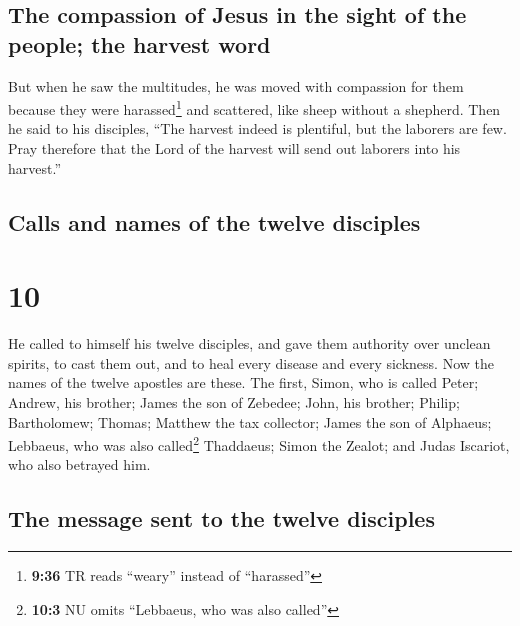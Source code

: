 \hypertarget{the-compassion-of-jesus-in-the-sight-of-the-people-the-harvest-word}{%
\subsection{The compassion of Jesus in the sight of the people; the
harvest
word}\label{the-compassion-of-jesus-in-the-sight-of-the-people-the-harvest-word}}

 But when he saw the multitudes, he was moved with
compassion for them because they were harassed\footnote{\textbf{9:36} TR
  reads ``weary'' instead of ``harassed''} and scattered, like sheep
without a shepherd.  Then he said to his disciples, ``The
harvest indeed is plentiful, but the laborers are few. 
Pray therefore that the Lord of the harvest will send out laborers into
his harvest.''

\hypertarget{calls-and-names-of-the-twelve-disciples}{%
\subsection{Calls and names of the twelve
disciples}\label{calls-and-names-of-the-twelve-disciples}}

\hypertarget{section-9}{%
\section{10}\label{section-9}}

 He called to himself his twelve disciples, and gave them
authority over unclean spirits, to cast them out, and to heal every
disease and every sickness.  Now the names of the twelve
apostles are these. The first, Simon, who is called Peter; Andrew, his
brother; James the son of Zebedee; John, his brother; 
Philip; Bartholomew; Thomas; Matthew the tax collector; James the son of
Alphaeus; Lebbaeus, who was also called\footnote{\textbf{10:3} NU omits
  ``Lebbaeus, who was also called''} Thaddaeus;  Simon the
Zealot; and Judas Iscariot, who also betrayed him.

\hypertarget{the-message-sent-to-the-twelve-disciples}{%
\subsection{The message sent to the twelve
disciples}\label{the-message-sent-to-the-twelve-disciples}}

